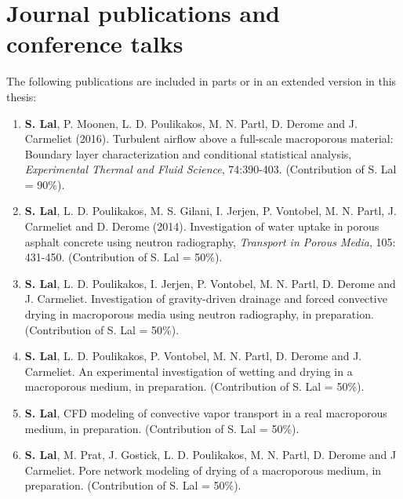 \chapter*{Journal publications and conference talks}

The following publications are included in parts or in an extended version in this thesis:
\begin{enumerate}
	 \item \textbf{S. Lal}, P. Moonen, L. D. Poulikakos, M. N. Partl, D. Derome and J.  Carmeliet (2016). Turbulent airflow above a full-scale macroporous material: Boundary layer characterization and conditional statistical analysis, \textit{Experimental Thermal and Fluid Science}, 74:390-403. (Contribution of S. Lal = 90\%). 
	 
	 \item \textbf{S. Lal}, L. D. Poulikakos, M. S. Gilani, I. Jerjen, P. Vontobel, M. N. Partl, J. Carmeliet and D. Derome (2014). Investigation of water uptake in porous asphalt concrete using neutron radiography, \textit{Transport in Porous Media}, 105: 431-450. (Contribution of S. Lal = 50\%). 
	 
	 
	 \item \textbf{S. Lal}, L. D. Poulikakos, I. Jerjen, P. Vontobel, M. N. Partl, D. Derome and J.  Carmeliet. Investigation of gravity-driven drainage and forced convective drying in macroporous media using neutron radiography, in preparation. (Contribution of S. Lal = 50\%).  
	 
	 \item \textbf{S. Lal}, L. D. Poulikakos, P. Vontobel, M. N. Partl, D. Derome and J.  Carmeliet. An experimental investigation of wetting and drying in a macroporous medium, in preparation.  (Contribution of S. Lal = 50\%).
	 
	 \item \textbf{S. Lal}, CFD modeling of convective vapor transport in a real macroporous medium, in preparation. (Contribution of S. Lal = 50\%).
	 
	 \item \textbf{S. Lal}, M. Prat, J. Gostick, L. D. Poulikakos, M. N. Partl, D. Derome and J Carmeliet. Pore network modeling of drying of a macroporous medium, in preparation. (Contribution of S. Lal = 50\%).	 
\end{enumerate}

